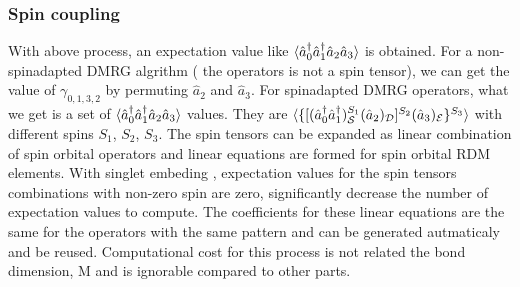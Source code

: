 
  \subsubsection{Spin coupling}

  With above process, an expectation value like $\braket{\hat{a}^\dagger_0\hat{a}^\dagger_1\hat{a}_2\hat{a}_3}$ is obtained. For a non-spinadapted DMRG algrithm ( the operators is not a spin tensor), we can get the value of $\gamma_{0,1,3,2}$ by permuting $ \hat{a}_2$ and $\hat{a}_3$. For spinadapted DMRG operators, what we get is a set of $\braket{\hat{a}^\dagger_0\hat{a}^\dagger_1\hat{a}_2\hat{a}_3}$  values. They are $\braket{\{[(\hat{a}^\dagger_0\hat{a}^\dagger_1)^{S_1}_{\mathcal{S}}(\hat{a}_2)_{\mathcal{D}}]^{S_2}(\hat{a}_3)_{\mathcal{E}}\}^{S_3}}$ with different spins $S_1$, $S_2$, $S_3$. The spin tensors can be expanded as linear combination of spin orbital operators and linear equations are formed for spin orbital RDM elements. With singlet embeding \cite{tatsuaki_interaction-round--face_2000}, expectation values for the spin tensors combinations with non-zero spin are zero, significantly decrease the number of expectation values to compute. The coefficients for these linear equations are the same for the operators with the same pattern and can be generated autmaticaly and be reused. Computational cost for this process is not related the bond dimension, M and is ignorable compared to other parts.

